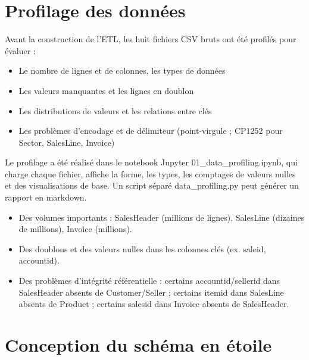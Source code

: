\documentclass[11pt,a4paper]{article}
\renewcommand{\texttt}[1]{{\ttfamily\small\colorbox{codebg}{\textcolor{darktext}{#1}}}}
\begin{document}
\section{Profilage des données}

Avant la construction de l'ETL, les huit fichiers CSV bruts ont été profilés pour évaluer :
\begin{itemize}[noitemsep,leftmargin=1.2em]
  \item Le nombre de lignes et de colonnes, les types de données
  \item Les valeurs manquantes et les lignes en doublon
  \item Les distributions de valeurs et les relations entre clés
  \item Les problèmes d'encodage et de délimiteur (point-virgule ; CP1252 pour Sector, SalesLine, Invoice)
\end{itemize}

Le profilage a été réalisé dans le notebook Jupyter \texttt{01\_data\_profiling.ipynb}, qui charge chaque fichier, affiche la forme, les types, les comptages de valeurs nulles et des visualisations de base. Un script séparé \texttt{data\_profiling.py} peut générer un rapport en markdown.

\begin{warnbox}
\begin{itemize}[noitemsep,leftmargin=1.2em]
  \item Des volumes importants : SalesHeader (millions de lignes), SalesLine (dizaines de millions), Invoice (millions).
  \item Des doublons et des valeurs nulles dans les colonnes clés (ex. \texttt{saleid}, \texttt{accountid}).
  \item Des problèmes d'intégrité référentielle : certains \texttt{accountid}/\texttt{sellerid} dans SalesHeader absents de Customer/Seller ; certains \texttt{itemid} dans SalesLine absents de Product ; certains \texttt{salesid} dans Invoice absents de SalesHeader.
\end{itemize}
\end{warnbox}

\section{Conception du schéma en étoile}
\end{document}
